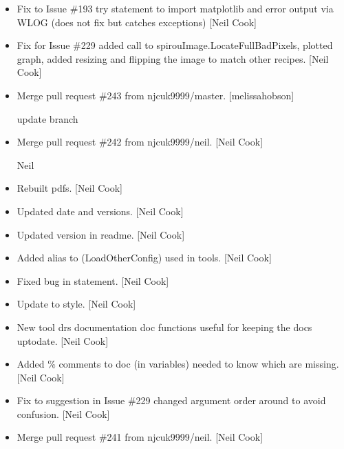 \documentclass[a4paper,10pt,english]{report}
\begin{document}
\begin{itemize}
\item {} 
Fix to Issue \#193 \sphinxhyphen{} try statement to import matplotlib and error
output via WLOG (does not fix but catches exceptions) {[}Neil Cook{]}

\item {} 
Fix for Issue \#229 \sphinxhyphen{} added call to
spirouImage.LocateFullBadPixels, plotted graph, added resizing
and flipping the image to match other recipes. {[}Neil Cook{]}

\item {} 
Merge pull request \#243 from njcuk9999/master. {[}melissa\sphinxhyphen{}hobson{]}

update branch

\item {} 
Merge pull request \#242 from njcuk9999/neil. {[}Neil Cook{]}

Neil

\item {} 
Re\sphinxhyphen{}built pdfs. {[}Neil Cook{]}

\item {} 
Updated date and versions. {[}Neil Cook{]}

\item {} 
Updated version in readme. {[}Neil Cook{]}

\item {} 
Added alias to  (LoadOtherConfig) \sphinxhyphen{} used in
tools. {[}Neil Cook{]}

\item {} 
Fixed bug in  statement. {[}Neil Cook{]}

\item {} 
Update to style. {[}Neil Cook{]}

\item {} 
New tool \sphinxhyphen{} drs documentation \sphinxhyphen{} doc functions useful for keeping the
docs up\sphinxhyphen{}to\sphinxhyphen{}date. {[}Neil Cook{]}

\item {} 
Added \% comments to doc (in variables) \sphinxhyphen{} needed to know which are
missing. {[}Neil Cook{]}

\item {} 
Fix to suggestion in Issue \#229 \sphinxhyphen{} changed argument order around to
avoid confusion. {[}Neil Cook{]}

\item {} 
Merge pull request \#241 from njcuk9999/neil. {[}Neil Cook{]}


\end{itemize}
\end{document}
